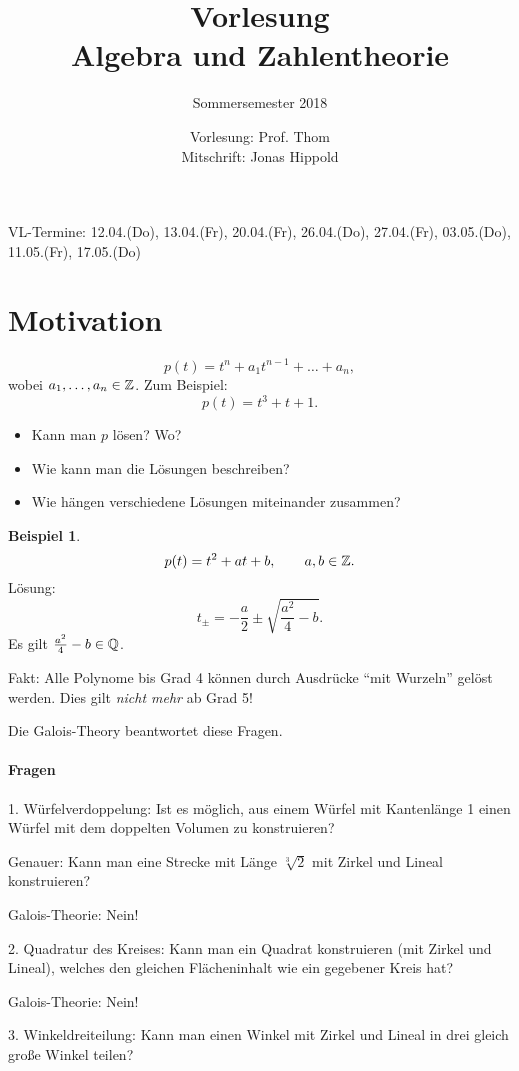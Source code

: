 \documentclass[
 a4paper,
 12pt,
 parskip=half
 ]{scrreprt}
\title{Vorlesung\\Algebra und Zahlentheorie}
\subtitle{Sommersemester 2018}
\author{Vorlesung: Prof. Thom\\Mitschrift: Jonas Hippold}
\theoremstyle{plain}
\theoremstyle{definition}
\newtheorem*{exmp*}{Beispiel}
\numberwithin{equation}{chapter}
\numberwithin{thm}{chapter}
\begin{document}
\maketitle

\tableofcontents

\clearpage

VL-Termine: 12.04.(Do), 13.04.(Fr), 20.04.(Fr), 26.04.(Do), 27.04.(Fr),
03.05.(Do), 11.05.(Fr), 17.05.(Do)

\chapter*{Motivation}
\[ p(t) = t^n + a_1 t^{n-1} + \ldots + a_n, \]
wobei $a_1, \ldots, a_n \in \mathbb{Z}$. Zum Beispiel:
\[ p(t) = t^3 + t + 1. \]

\begin{itemize}
\item Kann man $p$ lösen? Wo?
\item Wie kann man die Lösungen beschreiben?
\item Wie hängen verschiedene Lösungen miteinander zusammen?
\end{itemize}

\begin{exmp*}
  \[ p(t) = t^2 + at + b, \qquad a,b \in \mathbb{Z}. \]
  Lösung:
  \[ t_\pm = - \frac{a}{2} \pm \sqrt{\frac{a^2}{4} - b}. \]
  Es gilt $\frac{a^2}{4} - b \in \mathbb{Q}$.
\end{exmp*}

Fakt: Alle Polynome bis Grad 4 können durch Ausdrücke ``mit Wurzeln'' gelöst
werden. Dies gilt \emph{nicht mehr} ab Grad 5!

Die Galois-Theory beantwortet diese Fragen.

\subsubsection*{Fragen}
1. Würfelverdoppelung: Ist es möglich, aus einem Würfel mit Kantenlänge 1
einen Würfel mit dem doppelten Volumen zu konstruieren?

Genauer: Kann man eine Strecke mit Länge $\sqrt[3]{2}$ mit Zirkel und Lineal
konstruieren?

Galois-Theorie: Nein!

2. Quadratur des Kreises: Kann man ein Quadrat konstruieren (mit Zirkel und
Lineal), welches den gleichen Flächeninhalt wie ein gegebener Kreis hat?

Galois-Theorie: Nein!

3. Winkeldreiteilung: Kann man einen Winkel mit Zirkel und Lineal in drei gleich
große Winkel teilen?
\end{document}
